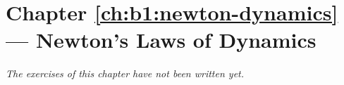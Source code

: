 \section*{Chapter \ref{ch:b1:newton-dynamics} --- Newton's Laws of Dynamics}


\emph{The exercises of this chapter have not been written yet.}
